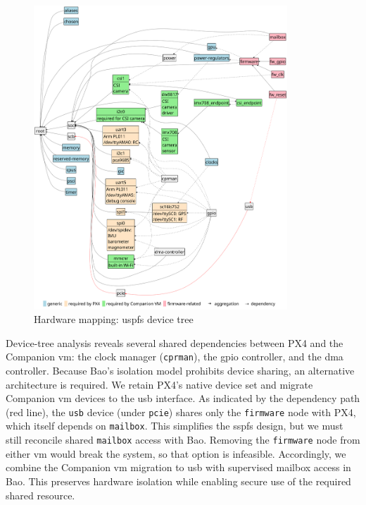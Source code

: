 \begin{figure}[!hbt]
  \centering
  \includegraphics[width=0.85\textwidth]{./img/pdf/hw-map-1} 
  \caption[Hardware mapping: USPFS device tree]{Hardware mapping: \gls{uspfs}
  device tree}%
  \label{fig:hw-map-1}
\end{figure}


Device-tree analysis reveals several shared dependencies between PX4 and the
Companion \gls{vm}: the clock manager (\lstinline{cprman}), the \gls{gpio}
controller, and the \gls{dma} controller. Because Bao’s isolation model
prohibits device sharing, an alternative architecture is required.
%
We retain PX4’s native device set and migrate Companion \gls{vm} devices to the
\gls{usb} interface. As indicated by the dependency path (red line), the
\lstinline{usb} device (under \lstinline{pcie}) shares only the
\lstinline{firmware} node with PX4, which itself depends on \lstinline{mailbox}.
%
This simplifies the \gls{sspfs} design, but we must still reconcile shared
\lstinline{mailbox} access with Bao. Removing the \lstinline{firmware} node from
either \gls{vm} would break the system, so that option is infeasible.
%
Accordingly, we combine the Companion \gls{vm} migration to \gls{usb} with
supervised mailbox access in Bao. This preserves hardware isolation while
enabling secure use of the required shared resource.

